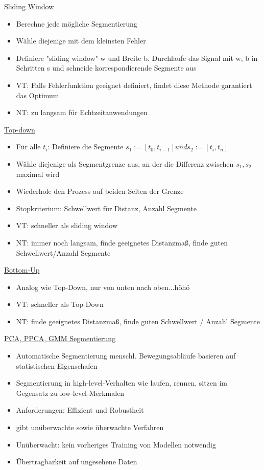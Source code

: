 \documentclass[a4paper,10pt,oneside]{article}
\begin{document}
\underline{Sliding Window} \\ 		
	\begin{itemize}
		\item Berechne jede mögliche Segmentierung
		\item Wähle diejenige mit dem kleinsten Fehler
		\item Definiere "sliding window" w und Breite b. Durchlaufe das Signal mit w, b in Schritten s und schneide korrespondierende Segmente aus
		\item VT: Falls Fehlerfunktion geeignet definiert, findet diese Methode garantiert das Optimum
		\item NT: zu langsam für Echtzeitanwendungen
	\end{itemize}
	
\underline{Top-down} \\
 	\begin{itemize}
 		\item Für alle $t_i$: Definiere die Segmente $s_1 := [t_0,t_{i-1}] und s_2 := [t_i,t_n]$
 		\item Wähle diejenige als Segmentgrenze aus, an der die Differenz zwischen $s_1,s_2$ maximal wird
 		\item Wiederhole den Prozess auf beiden Seiten der Grenze
 		\item Stopkriterium: Schwellwert für Distanz, Anzahl Segmente
 		\item VT: schneller als sliding window
 		\item NT: immer noch langsam, finde geeignetes Distanzmaß, finde guten Schwellwert/Anzahl Segmente
 	\end{itemize}
 		
\underline{Bottom-Up} \\
 	\begin{itemize}
 		\item Analog wie Top-Down, nur von unten nach oben...höhö
 		\item VT: schneller als Top-Down
 		\item NT: finde geeignetes Distanzmaß, finde guten Schwellwert / Anzahl Segmente
 	\end{itemize}
 	
\underline{PCA, PPCA, GMM Segmentierung} \\
 	\begin{itemize}
 		\item Automatische Segmentierung menschl. Bewegungsabläufe basieren auf statistischen Eigenschafen
 		\item Segmentierung in high-level-Verhalten wie laufen, rennen, sitzen im Gegensatz zu low-level-Merkmalen 
 		\item Anforderungen: Effizient und Robustheit
 		\item gibt unüberwachte sowie überwachte Verfahren
 		\item Unüberwacht: kein vorheriges Training von Modellen notwendig
 		\item Übertragbarkeit auf ungesehene Daten
 	\end{itemize}
 
\end{document}
